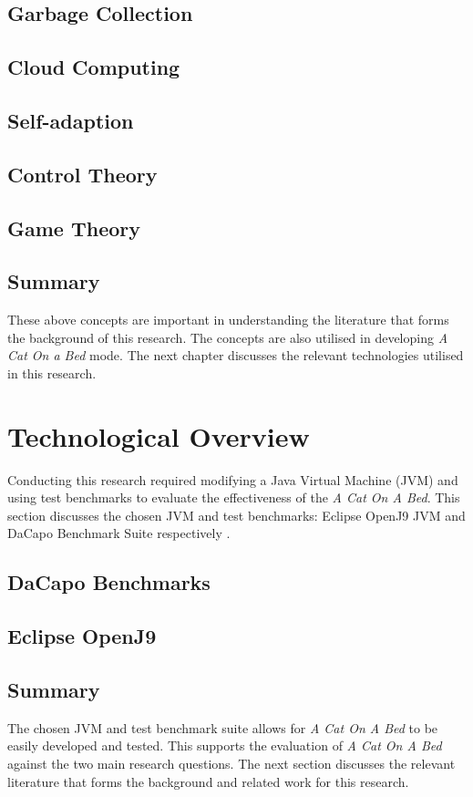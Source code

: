 \documentclass[12pt]{article}
\begin{document}
\subsection{Garbage Collection}

\subsection{Cloud Computing}

\subsection{Self-adaption}

\subsection{Control Theory}

\subsection{Game Theory}

\subsection{Summary}
These above concepts are important in understanding the literature that forms the background of this research. The concepts are also utilised in developing \emph{A Cat On a Bed} mode. The next chapter discusses the relevant technologies utilised in this research. 
\newpage
\section{Technological Overview}
Conducting this research required modifying a Java Virtual Machine (JVM) and using test benchmarks to evaluate the effectiveness of the \emph{A Cat On A Bed}. This section discusses the chosen JVM and test benchmarks: Eclipse OpenJ9 JVM and DaCapo Benchmark Suite respectively \cite{blackburn2006dacapo}.
\subsection{DaCapo Benchmarks}

\subsection{Eclipse OpenJ9}

\subsection{Summary}
The chosen JVM and test benchmark suite allows for \emph{A Cat On A Bed} to be easily developed and tested. This supports the evaluation of \emph{A Cat On A Bed} against the two main research questions. The next section discusses the relevant literature that forms the background and related work for this research. \newpage
\end{document}

